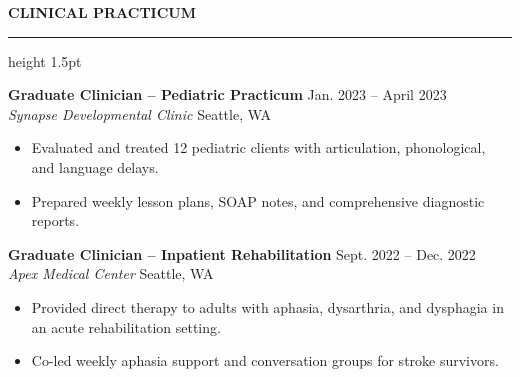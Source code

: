 \documentclass[10pt]{article}
\newcommand{\cvsection}[1]{%
  \vspace{10pt}%
  {\color{primary}\large\bfseries\MakeUppercase{#1}}%
  \vspace{3pt}%
  {\color{primary}\hrule height 1.5pt}%
  \vspace{6pt}%
}
\newcommand{\jobentry}[4]{%
  {\textbf{#1}} \hfill {\color{secondary}\small #3} \\
  {\color{secondary}\itshape #2} \hfill {\color{secondary}\small #4} \\
  \vspace{2pt}
}
\begin{document}
\begin{minipage}[t]{0.62\textwidth}
  \cvsection{Clinical Practicum}
  
  \jobentry{Graduate Clinician -- Pediatric Practicum}{Synapse Developmental Clinic}{Jan. 2023 -- April 2023}{Seattle, WA}
  \begin{itemize}
    \item Evaluated and treated 12 pediatric clients with articulation, phonological, and language delays.
    \item Prepared weekly lesson plans, SOAP notes, and comprehensive diagnostic reports.
  \end{itemize}
  
  \vspace{6pt}
  
  \jobentry{Graduate Clinician -- Inpatient Rehabilitation}{Apex Medical Center}{Sept. 2022 -- Dec. 2022}{Seattle, WA}
  \begin{itemize}
    \item Provided direct therapy to adults with aphasia, dysarthria, and dysphagia in an acute rehabilitation setting.
    \item Co-led weekly aphasia support and conversation groups for stroke survivors.
  \end{itemize}
\end{minipage}
\hfill
\end{document}
